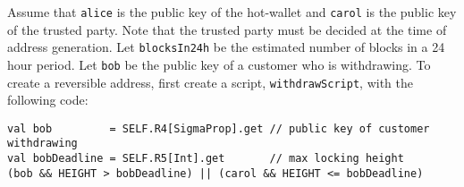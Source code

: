 \documentclass[runningheads]{llncs}
\newcommand{\langname}{ErgoScript\xspace}
\begin{document}
Assume that \texttt{alice} is the public key of the hot-wallet and \texttt{carol} is the public key of the trusted party. Note that the trusted party must be decided at the time of address generation.
Let \texttt{blocksIn24h} be the estimated number of blocks in a 24 hour period. 
Let \texttt{bob} be the public key of a customer who is withdrawing. 
To create a reversible address, first create a script, \texttt{withdrawScript}, with the following code:
\small{
\begin{verbatim}
val bob         = SELF.R4[SigmaProp].get // public key of customer withdrawing
val bobDeadline = SELF.R5[Int].get       // max locking height
(bob && HEIGHT > bobDeadline) || (carol && HEIGHT <= bobDeadline)
\end{verbatim}
}
\end{document}
